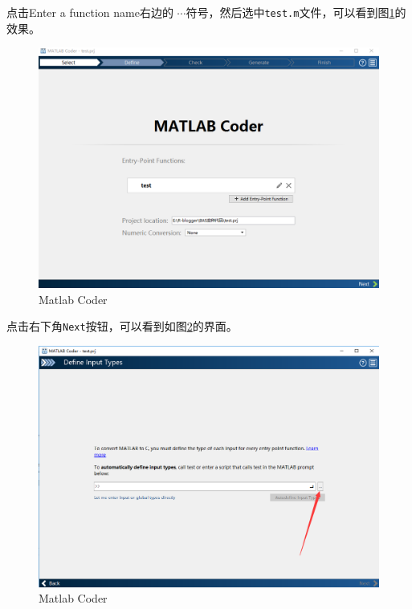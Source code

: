 \documentclass[]{ctexbook}
\theoremstyle{definition}
\theoremstyle{definition}
\theoremstyle{definition}
\theoremstyle{remark}
\begin{document}
点击Enter a function name右边的
\(\cdots\)符号，然后选中\texttt{test.m}文件，可以看到图\ref{fig:coder2}的效果。

\begin{figure}

{\centering \includegraphics[width=0.95\linewidth]{img/coder2} 

}

\caption{Matlab Coder}\label{fig:coder2}
\end{figure}

点击右下角\texttt{Next}按钮，可以看到如图\ref{fig:coder3}的界面。

\begin{figure}

{\centering \includegraphics[width=0.95\linewidth]{img/coder3} 

}

\caption{Matlab Coder}\label{fig:coder3}
\end{figure}
\end{document}
